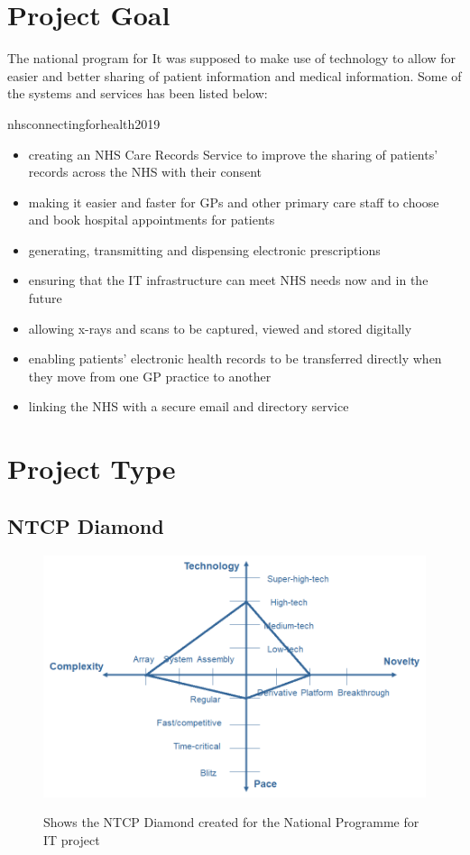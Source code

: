 \documentclass[a4paper,12pt]{scrartcl}
\begin{document}
	\section{Project Goal}
	{
		The national program for It was supposed to make use of technology to allow for easier and better sharing of patient information and medical information. Some of the systems and services has been listed below:
		\begin{displaycquote}{nhsconnectingforhealth2019}
			\begin{itemize}
				\item {creating an NHS Care Records Service to improve the sharing of patients' records across the NHS with their consent}
				\item {making it easier and faster for GPs and other primary care staff to choose and book hospital appointments for patients}
				\item {generating, transmitting and dispensing electronic prescriptions}
				\item {ensuring that the IT infrastructure can meet NHS needs now and in the future}
				\item {allowing x-rays and scans to be captured, viewed and stored digitally}
				\item {enabling patients' electronic health records to be transferred directly when they move from one GP practice to another}
				\item {linking the NHS with a secure email and directory service}
			\end{itemize}
		\end{displaycquote}
	}
	\section{Project Type}
	{
		\subsection{NTCP Diamond}
		{
			\begin{figure}
				\centering
				\includegraphics[width=\textwidth]{NationalProgrammeForITNTCP.png}
				\label{fig:NTCPDigram}
				\caption{Shows the NTCP Diamond created for the National Programme for IT project}
			\end{figure}
		}
	}
\end{document}
